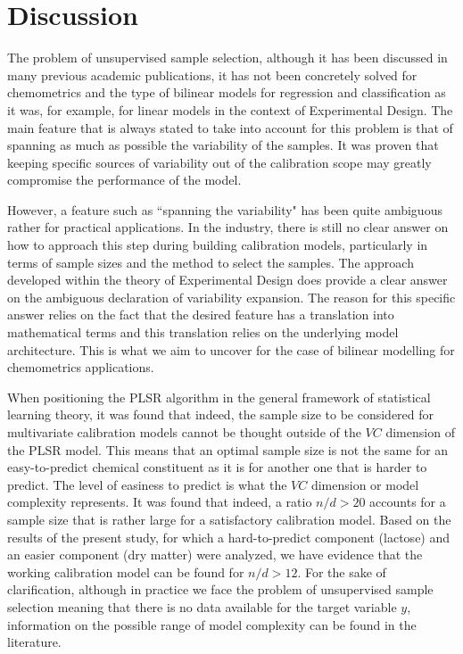 \documentclass[journal=ancham,manuscript=article]{achemso}
\begin{document}

\section*{Discussion}\label{discussion}

The problem of unsupervised sample selection, although it has been discussed in many previous academic publications, it has not been concretely solved for chemometrics and the type of bilinear models for regression and classification as it was, for example, for linear models in the context of Experimental Design. The main feature that is always stated to take into account for this problem is that of spanning as much as possible the variability of the samples. It was proven that keeping specific sources of variability out of the calibration scope may greatly compromise the performance of the model. 

However, a feature such as ``spanning the variability" has been quite ambiguous rather for practical applications. In the industry, there is still no clear answer on how to approach this step during building calibration models, particularly in terms of sample sizes and the method to select the samples. The approach developed within the theory of Experimental Design does provide a clear answer on the ambiguous declaration of variability expansion. The reason for this specific answer relies on the fact that the desired feature has a translation into mathematical terms and this translation relies on the underlying model architecture. This is what we aim to uncover for the case of bilinear modelling for chemometrics applications. 

When positioning the PLSR algorithm in the general framework of statistical learning theory, it was found that indeed, the sample size to be considered for multivariate calibration models cannot be thought outside of the $VC$ dimension of the PLSR model. This means that an optimal sample size is not the same for an easy-to-predict chemical constituent as it is for another one that is harder to predict. The level of easiness to predict is what the $VC$ dimension or model complexity represents. It was found that indeed, a ratio $n/d>20$ accounts for a sample size that is rather large for a satisfactory calibration model. Based on the results of the present study, for which a hard-to-predict component (lactose) and an easier component (dry matter) were analyzed, we have evidence that the working calibration model can be found for $n/d>12$. For the sake of clarification, although in practice we face the problem of unsupervised sample selection meaning that there is no data available for the target variable $y$, information on the possible range of model complexity can be found in the literature.
\end{document}
